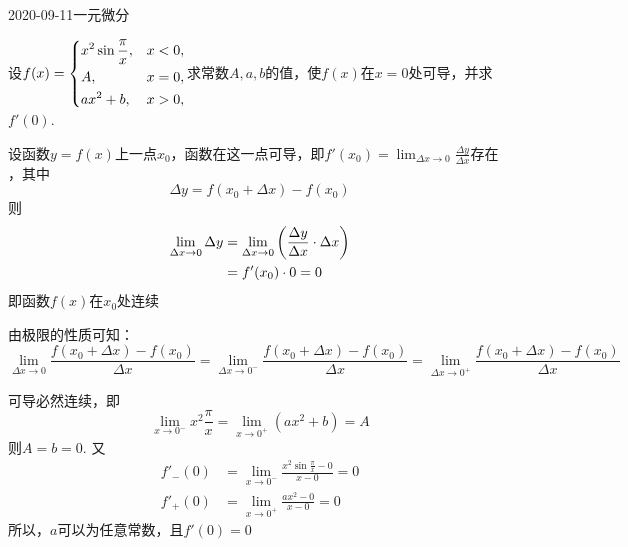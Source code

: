 \documentclass{ctexart}
\begin{document}
\begin{mathques}{2020-09-11}{一元微分}
\begin{ques}
  设$f(x) =
  \begin{dcases}
    x^2 \sin \frac{\pi}{x}, & x < 0, \\
    A, & x = 0, \\
    ax^2 + b, & x > 0,\\
  \end{dcases}
  $求常数$A, a, b$的值，使$f(x)$在$x = 0$处可导，并求$f'(0)$.
\end{ques}
\begin{solu}
  \begin{mathideabox}
    设函数$y = f(x)$上一点$x_0$，函数在这一点可导，即$f'(x_0) = \lim_{\Delta x
    \to 0} \frac{\Delta y}{\Delta x}存在$，其中
    \[
      \Delta y = f(x_0 + \Delta x) - f(x_0)
    \]
    则
    \begin{align*}
      \lim_{\Delta x \to 0} \Delta y &= \lim_{\Delta x \to 0} \qty(\frac{\Delta
      y}{\Delta x}\cdot \Delta x)\\
      &= f'(x_0) \cdot 0 = 0
    \end{align*}
    即函数$f(x)$在$x_0$处连续
  \end{mathideabox}
  \begin{mathideabox}[导数存在必然有左右导数相等]
    由极限的性质可知：
    \[
      \lim_{\Delta x \to 0} \frac{f(x_0 + \Delta x) - f(x_0)}{\Delta x}
      =\lim_{\Delta x \to 0^-} \frac{f(x_0 + \Delta x) - f(x_0)}{\Delta x}
      =\lim_{\Delta x \to 0^+} \frac{f(x_0 + \Delta x) - f(x_0)}{\Delta x}
    \]
  \end{mathideabox}
  可导必然连续，即
  \[
    \lim_{x \to 0^-} x^2 \frac{\pi}{x} = \lim_{x \to 0^+} (ax^2 + b) = A
  \]
  则$A = b = 0$.
  又
  \begin{align*}
    f'_-(0) &= \lim_{x \to 0^-} \frac{x^2 \sin \frac{\pi}{x} - 0}{x - 0} = 0\\
    f'_+(0) &= \lim_{x \to 0^+} \frac{ax^2 - 0}{x - 0} = 0
  \end{align*}
  所以，$a$可以为任意常数，且$f'(0) = 0$
\end{solu}
\end{mathques}
\end{document}
